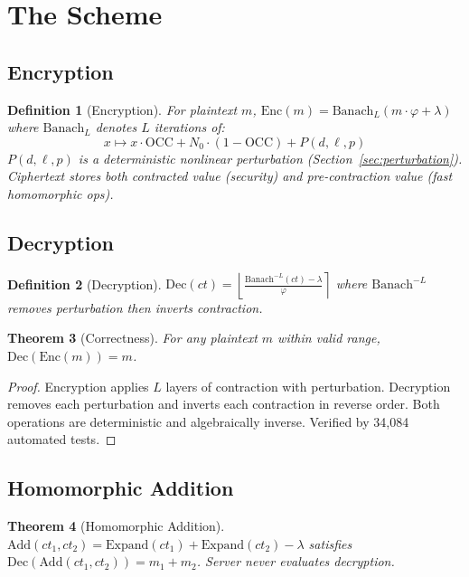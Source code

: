 \documentclass[11pt,a4paper]{article}
\newtheorem{theorem}{Theorem}[section]
\newtheorem{definition}[theorem]{Definition}
\begin{document}
\section{The Scheme}

\subsection{Encryption}

\begin{definition}[Encryption]
For plaintext $m$, $\text{Enc}(m) = \text{Banach}_L(m \cdot \varphi + \lambda)$ where $\text{Banach}_L$ denotes $L$ iterations of:
\[
x \mapsto x \cdot \text{OCC} + N_0 \cdot (1 - \text{OCC}) + P(d, \ell, p)
\]
$P(d, \ell, p)$ is a deterministic nonlinear perturbation (Section~\ref{sec:perturbation}). Ciphertext stores both contracted value (security) and pre-contraction value (fast homomorphic ops).
\end{definition}

\subsection{Decryption}

\begin{definition}[Decryption]
$\text{Dec}(ct) = \left\lfloor \frac{\text{Banach}^{-L}(ct) - \lambda}{\varphi} \right\rceil$ where $\text{Banach}^{-L}$ removes perturbation then inverts contraction.
\end{definition}

\begin{theorem}[Correctness]
For any plaintext $m$ within valid range, $\text{Dec}(\text{Enc}(m)) = m$.
\end{theorem}
\begin{proof}
Encryption applies $L$ layers of contraction with perturbation. Decryption removes each perturbation and inverts each contraction in reverse order. Both operations are deterministic and algebraically inverse. Verified by 34,084 automated tests.
\end{proof}

\subsection{Homomorphic Addition}

\begin{theorem}[Homomorphic Addition]
$\text{Add}(ct_1, ct_2) = \text{Expand}(ct_1) + \text{Expand}(ct_2) - \lambda$ satisfies $\text{Dec}(\text{Add}(ct_1, ct_2)) = m_1 + m_2$. Server never evaluates decryption.
\end{theorem}
\end{document}
